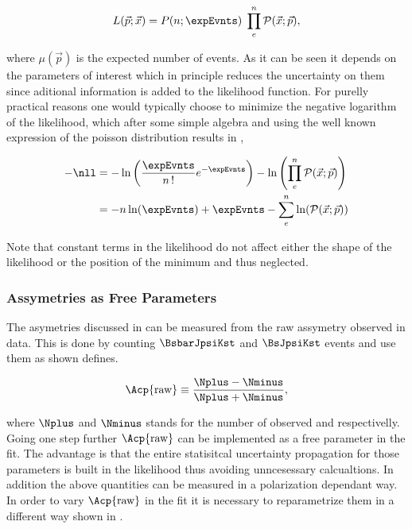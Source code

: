 \begin{equation}
L(\vec{p};\vec{x}) = P(n;\expEvnts) \; \prod_e^n \mathcal{P}(\vec{x};\vec{p}),
\label{extlikelihood}
\end{equation}

\noindent where $\mu(\vec{p})$ is the expected number of events. As it can be seen it depends on the parameters of interest which in 
principle reduces the uncertainty on them since aditional information is added to the likelihood function.
For purelly practical reasons one would typically choose to minimize the negative logarithm of the likelihood, which after some simple
algebra and using the well known expression of the poisson distribution results in ,

\begin{align}
  -\nll &= -\ln\left( \frac{\expEvnts}{n\,!} e^{-\expEvnts } \right) - \ln\left( \prod_e^n \mathcal{P}(\vec{x};\vec{p}) \right)  \nonumber \\
        &= - n\ln(\expEvnts) + \expEvnts - \sum_e^n \ln( \mathcal{P}(\vec{x};\vec{p}) )
\label{extloglikelihood}
\end{align}

\noindent Note that constant terms in the likelihood do not affect either the shape of the likelihood or the position of the minimum and thus neglected.


\subsubsection{\CP Assymetries as Free Parameters}
\label{cp_assymetries_and_total_decay_rate}
The \CP asymetries discussed in  can be measured from the raw assymetry observed in data.
This is done by counting $\BsbarJpsiKst$ and $\BsJpsiKst$ events and use them as shown  defines.

\begin{equation}
\Acp{\text{raw}} \equiv \frac{\Nplus - \Nminus}{\Nplus + \Nminus},
\label{acp_mes}
\end{equation}

\noindent where $\Nplus$ and $\Nminus$ stands for the number of observed \BsbarJpsiKst and \BsJpsiKst respectivelly. 
Going one step further $\Acp{\text{raw}}$ can be implemented as a free parameter in the fit. The advantage
is that the entire statisitcal uncertainty propagation for those parameters is built in the likelihood thus avoiding
unncesessary calcualtions. In addition the above quantities can be measured in a polarization dependant way. In order
to vary $\Acp{\text{raw}}$ in the fit it is necessary to reparametrize them in a different way shown in .

